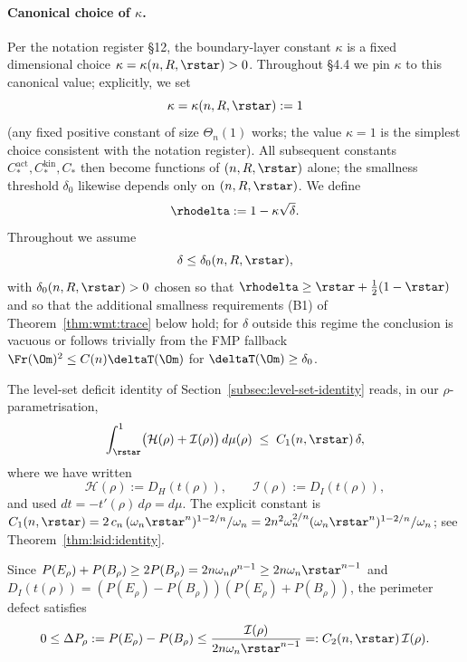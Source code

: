 \paragraph{Canonical choice of $\kappa$.}
Per the notation register \S12, the boundary-layer constant $\kappa$ is
a fixed dimensional choice $\kappa=\kappa(n,R,\rstar)>0$. Throughout
\S4.4 we pin $\kappa$ to this canonical value; explicitly, we set
\[
   \kappa=\kappa(n,R,\rstar):=1
\]
(any fixed positive constant of size $\Theta_n(1)$ works; the value
$\kappa=1$ is the simplest choice consistent with the notation
register). All subsequent constants $C_*^{\mathrm{act}},
C_*^{\mathrm{kin}}, C_*$ then become functions of $(n,R,\rstar)$ alone;
the smallness threshold $\delta_0$ likewise depends only on
$(n,R,\rstar)$. We define
\[
   \rhodelta:=1-\kappa\sqrt{\delta}.
\]
Throughout we assume
\begin{equation}\label{eq:wmt:delta-small}
   \delta\le\delta_0(n,R,\rstar),
\end{equation}
with $\delta_0(n,R,\rstar)>0$ chosen so that
$\rhodelta\ge\rstar+\tfrac12(1-\rstar)$ and so that the additional
smallness requirements (B1) of Theorem~\ref{thm:wmt:trace} below hold;
for $\delta$ outside this regime the conclusion is vacuous or follows
trivially from the FMP fallback $\Fr(\Om)^2\le C(n)\deltaT(\Om)$ for
$\deltaT(\Om)\ge\delta_0$.

The level-set deficit identity of Section~\ref{subsec:level-set-identity}
reads, in our $\rho$-parametrisation,
\begin{equation}\label{eq:wmt:DH-DI-int}
   \int_{\rstar}^{1}
      \bigl(\mathcal H(\rho)+\mathcal I(\rho)\bigr)\,d\mu(\rho)
   \;\le\; C_1(n,\rstar)\,\delta,
\end{equation}
where we have written
\[
   \mathcal H(\rho):=D_H(t(\rho)),\qquad
   \mathcal I(\rho):=D_I(t(\rho)),
\]
and used $dt=-t'(\rho)\,d\rho=d\mu$. The explicit constant is
$C_1(n,\rstar)=2\,c_n\,(\omega_n\rstar^n)^{1-2/n}/\omega_n
=2n^2\omega_n^{2/n}(\omega_n\rstar^n)^{1-2/n}/\omega_n$; see
Theorem~\ref{thm:lsid:identity}.

Since $P(E_\rho)+P(B_\rho)\ge 2P(B_\rho)=2n\omega_n\rho^{n-1}\ge
2n\omega_n\rstar^{n-1}$ and $D_I(t(\rho))
=(P(E_\rho)-P(B_\rho))(P(E_\rho)+P(B_\rho))$, the perimeter defect
satisfies
\begin{equation}\label{eq:wmt:DP-DI}
   0\le\Delta P_\rho
        :=P(E_\rho)-P(B_\rho)
   \le \frac{\mathcal I(\rho)}{2n\omega_n\rstar^{n-1}}
   =: C_2(n,\rstar)\,\mathcal I(\rho).
\end{equation}

